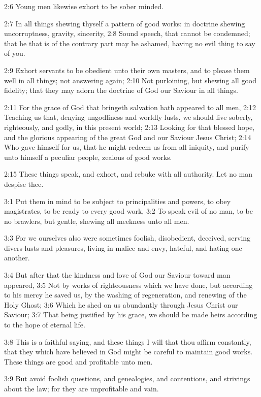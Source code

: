 2:6 Young men likewise exhort to be sober minded.

2:7 In all things shewing thyself a pattern of good works: in doctrine
shewing uncorruptness, gravity, sincerity, 2:8 Sound speech, that
cannot be condemned; that he that is of the contrary part may be
ashamed, having no evil thing to say of you.

2:9 Exhort servants to be obedient unto their own masters, and to
please them well in all things; not answering again; 2:10 Not
purloining, but shewing all good fidelity; that they may adorn the
doctrine of God our Saviour in all things.

2:11 For the grace of God that bringeth salvation hath appeared to all
men, 2:12 Teaching us that, denying ungodliness and worldly lusts, we
should live soberly, righteously, and godly, in this present world;
2:13 Looking for that blessed hope, and the glorious appearing of the
great God and our Saviour Jesus Christ; 2:14 Who gave himself for us,
that he might redeem us from all iniquity, and purify unto himself a
peculiar people, zealous of good works.

2:15 These things speak, and exhort, and rebuke with all authority.
Let no man despise thee.

3:1 Put them in mind to be subject to principalities and powers, to
obey magistrates, to be ready to every good work, 3:2 To speak evil of
no man, to be no brawlers, but gentle, shewing all meekness unto all
men.

3:3 For we ourselves also were sometimes foolish, disobedient,
deceived, serving divers lusts and pleasures, living in malice and
envy, hateful, and hating one another.

3:4 But after that the kindness and love of God our Saviour toward man
appeared, 3:5 Not by works of righteousness which we have done, but
according to his mercy he saved us, by the washing of regeneration,
and renewing of the Holy Ghost; 3:6 Which he shed on us abundantly
through Jesus Christ our Saviour; 3:7 That being justified by his
grace, we should be made heirs according to the hope of eternal life.

3:8 This is a faithful saying, and these things I will that thou
affirm constantly, that they which have believed in God might be
careful to maintain good works. These things are good and profitable
unto men.

3:9 But avoid foolish questions, and genealogies, and contentions, and
strivings about the law; for they are unprofitable and vain.

